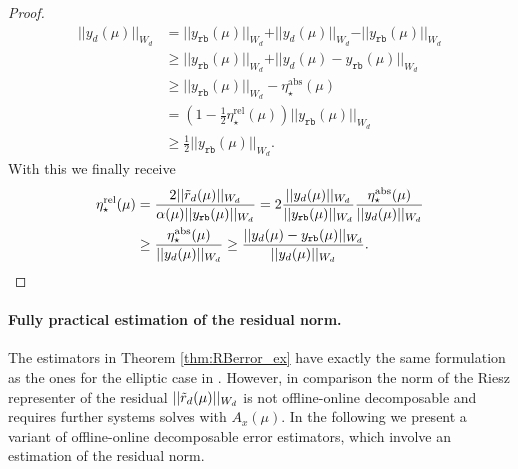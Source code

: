 \documentclass{article}
\theoremstyle{plain}
\theoremstyle{definition}
\theoremstyle{remark}
\newcommand{\RBestFineABS}{\eta_\star^\text{abs}}
\newcommand{\RBestFineREL}{\eta_\star^\text{rel}}
\begin{document}
\begin{proof}
\begin{align}
    \vert \vert y_d(\mu) \vert \vert_{W_d} &= \vert \vert y_{\texttt{rb}}(\mu) \vert \vert_{W_d} + \vert \vert y_d(\mu) \vert \vert_{W_d} - \vert \vert y_{\texttt{rb}}(\mu) \vert \vert_{W_d} \\
    &\geq \vert \vert y_{\texttt{rb}}(\mu) \vert \vert_{W_d} + \vert \vert y_d(\mu) - y_{\texttt{rb}}(\mu) \vert \vert_{W_d} \\
    &\geq \vert \vert y_{\texttt{rb}}(\mu) \vert \vert_{W_d} - \RBestFineABS(\mu) \\&= \left(1 - \frac{1}{2}\RBestFineREL(\mu)\right) \vert \vert y_{\texttt{rb}}(\mu) \vert \vert_{W_d} \\
    &\geq \frac{1}{2} \vert \vert y_{\texttt{rb}}(\mu) \vert \vert_{W_d} .
\end{align}
With this we finally receive
\begin{align}
    \RBestFineREL(\mu) &= \frac{2\vert \vert \Tilde{r}_d(\mu) \vert \vert _{W_d}}{\alpha(\mu)\vert \vert y_{\texttt{rb}}(\mu) \vert \vert _{W_d}} = 2 \frac{\vert \vert y_d(\mu) \vert \vert_{W_d}}{\vert \vert y_{\texttt{rb}}(\mu) \vert \vert_{W_d}} \frac{\RBestFineABS(\mu)}{\vert \vert y_d(\mu) \vert \vert_{W_d}}\\
    &\geq \frac{\RBestFineABS(\mu)}{\vert \vert y_d(\mu) \vert \vert_{W_d}} \geq \frac{\vert \vert y_{d}(\mu) - y_{\texttt{rb}}(\mu) \vert \vert _{W_d}}{\vert \vert y_{d}(\mu) \vert \vert _{W_d}} .
\end{align}
\end{proof}

\paragraph*{Fully practical estimation of the residual norm.}
The estimators in Theorem \ref{thm:RBerror_ex} have exactly the same formulation as the ones for the elliptic case in \cites[Prop.~4.4]{Hesthaven2016}[Prop.~2.24, 2.27]{haasdonk2017reduced}. However, in comparison the norm of the Riesz representer of the residual $\vert \vert \Tilde{r}_d(\mu) \vert \vert _{W_d}$ is not offline-online decomposable and requires further systems solves with $A_x(\mu)$. In the following we present a variant of offline-online decomposable error estimators, which involve an estimation of the residual norm. \\
\end{document}
